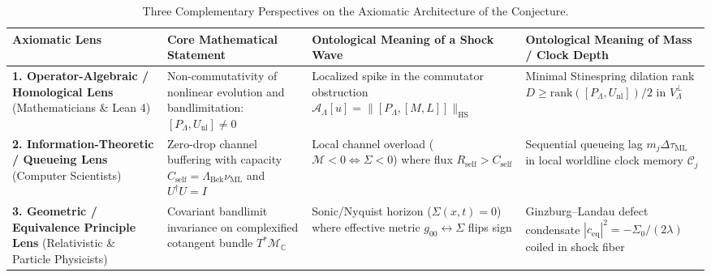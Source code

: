 \documentclass[11pt,a4paper]{article}
\theoremstyle{definition}
\begin{document}
\begin{table}[htbp]
\centering
\caption{Three Complementary Perspectives on the Axiomatic Architecture of the Conjecture.}
\label{tab:axiomatic-lenses}
\footnotesize
\begin{tabular}{L{3.1cm}L{3.8cm}L{3.5cm}L{3.6cm}}
\toprule
\textbf{Axiomatic Lens} & \textbf{Core Mathematical Statement} & \textbf{Ontological Meaning of a Shock Wave} & \textbf{Ontological Meaning of Mass / Clock Depth} \\
\midrule
\textbf{1. Operator-Algebraic / Homological Lens} (Mathematicians \& Lean 4) & Non-commutativity of nonlinear evolution and bandlimitation: $[P_{\Lambda}, U_{\text{nl}}] \ne 0$ & Localized spike in the commutator obstruction $\mathcal{A}_{\Lambda}[u] = \|[P_{\Lambda}, [M, L]]\|_{\text{HS}}$ & Minimal Stinespring dilation rank $D \ge \mathrm{rank}([P_{\Lambda}, U_{\text{nl}}])/2$ in $V_{\Lambda}^{\perp}$ \\
\addlinespace
\textbf{2. Information-Theoretic / Queueing Lens} (Computer Scientists) & Zero-drop channel buffering with capacity $C_{\text{self}} = \Lambda_{\text{Bek}}\nu_{\text{ML}}$ and $U^\dagger U = I$ & Local channel overload ($\mathcal{M} < 0 \iff \Sigma < 0$) where flux $R_{\text{self}} > C_{\text{self}}$ & Sequential queueing lag $m_j \Delta\tau_{\text{ML}}$ in local worldline clock memory $\mathcal{C}_j$ \\
\addlinespace
\textbf{3. Geometric / Equivalence Principle Lens} (Relativistic \& Particle Physicists) & Covariant bandlimit invariance on complexified cotangent bundle $T^*\mathcal{M}_{\mathbb{C}}$ & Sonic/Nyquist horizon ($\Sigma(x,t) = 0$) where effective metric $g_{00} \leftrightarrow \Sigma$ flips sign & Ginzburg--Landau defect condensate $|c_{\text{eq}}|^2 = -\Sigma_0/(2\lambda)$ coiled in shock fiber \\
\bottomrule
\end{tabular}
\end{table}
\end{document}

